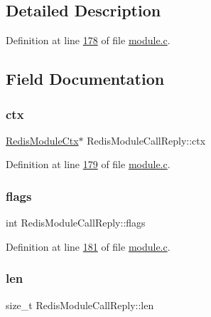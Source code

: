 \subsection{Detailed Description}


Definition at line \hyperlink{module_8c_source_l00178}{178} of file \hyperlink{module_8c_source}{module.\+c}.



\subsection{Field Documentation}
\mbox{\label{structRedisModuleCallReply_afd2c494b994b0b7e5e82fd2f9defc602}} 
\subsubsection{\texorpdfstring{ctx}{ctx}}
{\footnotesize\ttfamily \hyperlink{structRedisModuleCtx}{Redis\+Module\+Ctx}$\ast$ Redis\+Module\+Call\+Reply\+::ctx}



Definition at line \hyperlink{module_8c_source_l00179}{179} of file \hyperlink{module_8c_source}{module.\+c}.

\mbox{\label{structRedisModuleCallReply_aba785e23052e74dffa16435c2e792e54}} 
\subsubsection{\texorpdfstring{flags}{flags}}
{\footnotesize\ttfamily int Redis\+Module\+Call\+Reply\+::flags}



Definition at line \hyperlink{module_8c_source_l00181}{181} of file \hyperlink{module_8c_source}{module.\+c}.

\mbox{\label{structRedisModuleCallReply_a118a3314c59e3073ff5060b29b6bebf3}} 
\subsubsection{\texorpdfstring{len}{len}}
{\footnotesize\ttfamily size\+\_\+t Redis\+Module\+Call\+Reply\+::len}



